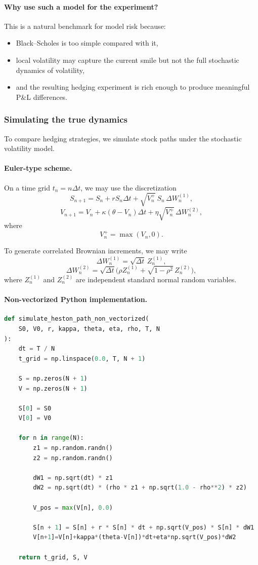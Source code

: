 \documentclass[11pt]{article}
\theoremstyle{plain}
\theoremstyle{definition}
\theoremstyle{remark}
\begin{document}
\paragraph{Why use such a model for the experiment?}
This is a natural benchmark for model risk because:
\begin{itemize}[leftmargin=1.4em]
    \item Black--Scholes is too simple compared with it,
    \item local volatility may capture the current smile but not the full
    stochastic dynamics of volatility,
    \item and the resulting hedging experiment is rich enough to produce
    meaningful P\&L differences.
\end{itemize}

\subsubsection{Simulating the true dynamics}

To compare hedging strategies, we simulate stock paths under the
stochastic volatility model.

\paragraph{Euler-type scheme.}
On a time grid \(t_n=n\Delta t\), we may use the discretization
\[
S_{n+1}
=
S_n
+
rS_n\Delta t
+
\sqrt{V_n^+}\,S_n\,\Delta W_n^{(1)},
\]
\[
V_{n+1}
=
V_n
+
\kappa(\theta-V_n)\Delta t
+
\eta\sqrt{V_n^+}\,\Delta W_n^{(2)},
\]
where
\[
V_n^+=\max(V_n,0).
\]

To generate correlated Brownian increments, we may write
\[
\Delta W_n^{(1)}=\sqrt{\Delta t}\,Z_n^{(1)},
\]
\[
\Delta W_n^{(2)}
=
\sqrt{\Delta t}\big(
\rho Z_n^{(1)}+\sqrt{1-\rho^2}\,Z_n^{(2)}
\big),
\]
where \(Z_n^{(1)}\) and \(Z_n^{(2)}\) are independent standard normal
random variables.

\paragraph{Non-vectorized Python implementation.}
\begin{lstlisting}[language=Python]
def simulate_heston_path_non_vectorized(
    S0, V0, r, kappa, theta, eta, rho, T, N
):
    dt = T / N
    t_grid = np.linspace(0.0, T, N + 1)

    S = np.zeros(N + 1)
    V = np.zeros(N + 1)

    S[0] = S0
    V[0] = V0

    for n in range(N):
        z1 = np.random.randn()
        z2 = np.random.randn()

        dW1 = np.sqrt(dt) * z1
        dW2 = np.sqrt(dt) * (rho * z1 + np.sqrt(1.0 - rho**2) * z2)

        V_pos = max(V[n], 0.0)

        S[n + 1] = S[n] + r * S[n] * dt + np.sqrt(V_pos) * S[n] * dW1
        V[n+1]=V[n]+kappa*(theta-V[n])*dt+eta*np.sqrt(V_pos)*dW2

    return t_grid, S, V
\end{lstlisting}
\end{document}
